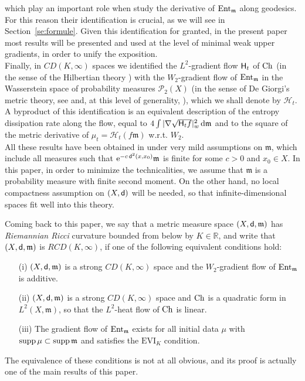 \documentclass[reqno,11pt]{article}
\numberwithin{equation}{section}
\newcommand{\C}{\mathbb{C}}
\newcommand{\R}{\mathbb{R}}
\newcommand{\mm}{{\mbox{\boldmath$m$}}}
\newcommand{\sfd}{{\sf d}}
\newcommand{\rme}{{\mathrm e}}
\newcommand{\supp}{\mathop{\rm supp}\nolimits}   %
\renewcommand{\d}{{\mathrm d}}
\newcommand{\EVI}[4]{\mathrm{EVI}_{#4}(#1,{#2}_W,#3)}
\newcommand{\entv}{{\rm Ent}_{\mm}}                    %
\newcommand{\weakgrad}[1]{|\nabla #1|_w}                %
\renewcommand{\C}{{\rm Ch}}
\newcommand{\rcd}[2]{RCD(#1,#2)}
\newcommand{\heatl}{{\sf H}}
\newcommand{\heatw}{{\mathscr H}}
\renewcommand{\EVI}{\ensuremath{\mathrm{EVI}}}
\renewcommand{\mm}{\mathfrak m}
\begin{document}
which play an important role when study the derivative of $\entv$
along geodesics. For this reason their identification is crucial, as
we will see in Section~\ref{se:formule}. Given this identification
for granted, in the present paper most results will be presented and
used at the
level of minimal weak upper gradients, in order to unify the exposition. \\
Finally, in $CD(K,\infty)$ spaces we identified the $L^2$-gradient
flow $\heatl_t$ of $\C$ (in the sense of the Hilbertian theory
\cite{Brezis73}) with the $W_2$-gradient flow of $\entv$ in the
Wasserstein space of probability measures $\mathscr P_2(X)$ (in the
sense of De Giorgi's metric theory, see
\cite{Ambrosio-Gigli-Savare08} and, at this level of generality,
\cite{Gigli10}), which we shall denote by $\heatw_t$. A byproduct of
this identification is an equivalent description of the entropy
dissipation rate along the flow, equal to
$4\int\weakgrad{\sqrt{\heatl_tf}}^2\,\d\mm$ and to the square of the
metric derivative of $\mu_t=\heatw_t (f\mm)$ w.r.t. $W_2$.\\ All
these results have been obtained in \cite{Ambrosio-Gigli-Savare11}
under very mild assumptions on $\mm$, which include all measures
such that $ \rme^{-c\,\sfd^2(x,x_0)}\mm$ is finite for some $c>0$
and $x_0\in X$. In this paper, in order to minimize the
technicalities, we assume that $\mm$ is a probability measure with
finite second moment. On the other hand, no local compactness
assumption on $(X,\sfd)$ will be needed, so that
infinite-dimensional spaces fit well into this theory.

Coming back to this paper, we say that a metric measure space
$(X,\sfd,\mm)$ has \emph{Riemannian Ricci} curvature bounded from
below by $K\in\R$, and write that $(X,\sfd,\mm)$ is $\rcd K\infty$,
if one of the following equivalent conditions hold:
\begin{itemize}
\item[(i)] $(X,\sfd,\mm)$ is a strong $CD(K,\infty)$ space and the
$W_2$-gradient flow of $\entv$ is additive.
\item[(ii)] $(X,\sfd,\mm)$ is a strong $CD(K,\infty)$ space and
$\C$ is a quadratic form in $L^2(X,\mm)$, so that the $L^2$-heat
flow of $\C$ is linear.
\item[(iii)] The gradient flow of $\entv$ exists for all initial
data $\mu$ with $\supp\mu\subset\supp\mm$ and satisfies the $\EVI_K$
condition.
\end{itemize}
The equivalence of these conditions is not at all obvious, and its
proof is actually one of the main results of this paper.
\end{document}
